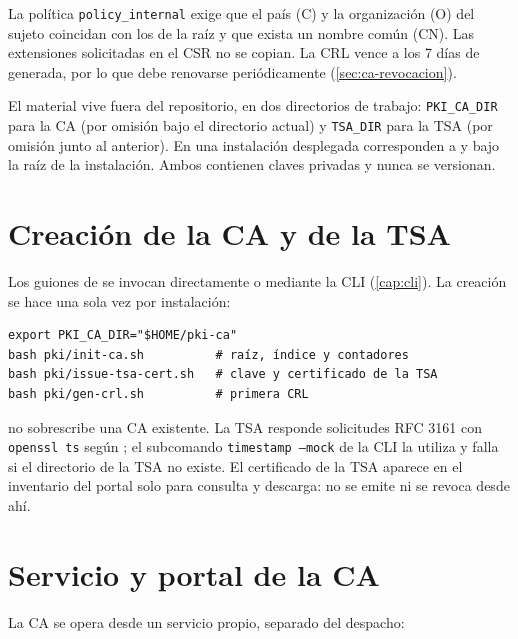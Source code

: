La política \texttt{policy\_internal} exige que el país (C) y la organización
(O) del sujeto coincidan con los de la raíz y que exista un nombre común (CN).
Las extensiones solicitadas en el CSR no se copian. La CRL vence a los 7 días
de generada, por lo que debe renovarse periódicamente
(\cref{sec:ca-revocacion}).

El material vive fuera del repositorio, en dos directorios de trabajo:
\texttt{PKI\_CA\_DIR} para la CA (por omisión  bajo el
directorio actual) y \texttt{TSA\_DIR} para la TSA (por omisión
 junto al anterior). En una instalación desplegada
corresponden a  y  bajo la raíz de la
instalación. Ambos contienen claves privadas y nunca se versionan.

\section{Creación de la CA y de la TSA}\label{sec:ca-creacion}

Los guiones de  se invocan directamente o mediante la CLI
(\cref{cap:cli}). La creación se hace una sola vez por instalación:

\begin{verbatim}
export PKI_CA_DIR="$HOME/pki-ca"
bash pki/init-ca.sh          # raíz, índice y contadores
bash pki/issue-tsa-cert.sh   # clave y certificado de la TSA
bash pki/gen-crl.sh          # primera CRL
\end{verbatim}

 no sobrescribe una CA existente. La TSA responde
solicitudes RFC 3161 con \texttt{openssl ts} según ; el
subcomando \texttt{timestamp --mock} de la CLI la utiliza y falla si el
directorio de la TSA no existe. El certificado de la TSA aparece en el inventario
del portal solo para consulta y descarga: no se emite ni se revoca desde ahí.


\section{Servicio y portal de la CA}\label{sec:ca-portal}

La CA se opera desde un servicio propio, separado del despacho:

